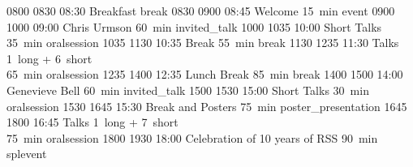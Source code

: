 \begin{timetable}
   {0800} {0830} {08:30 Breakfast}                      {}                            {}        {break}
   {0830} {0900} {08:45 Welcome}                      {\vspace{1.5mm}15~min}          {}        {event}
   {0900} {1000} {09:00 Chris Urmson}                 {60~min}                        {}                      {invited_talk}
   {1000} {1035} {10:00 Short Talks}                  {\vspace{1.5mm}35~min}          {}        {oralsession}
   {1035} {1130} {10:35 Break}                        {\vspace{1.5mm}55~min}          {}      {break}
   {1130} {1235} {11:30 Talks}                        {\vspace{-0.5em}1~long + 6~short\\65~min}{}             {oralsession}
   {1235} {1400} {12:35 Lunch Break}                  {85~min}                        {}                            {break}
   {1400} {1500} {14:00 Genevieve Bell}               {60~min}                        {}                      {invited_talk}
   {1500} {1530} {15:00 Short Talks} 		      {\vspace{1.5mm}30~min}          {}        {oralsession}
   {1530} {1645} {15:30 Break and Posters}            {\vspace{1.5mm}75~min}          {}      {poster_presentation}
   {1645} {1800} {16:45 Talks}                        {\vspace{-0.5em}1~long + 7~short\\75~min}{}             {oralsession}
   {1800} {1930} {18:00 Celebration of 10 years of RSS}  	              {\vspace{1.5mm}90~min}          {}        {splevent}



\end{timetable}
